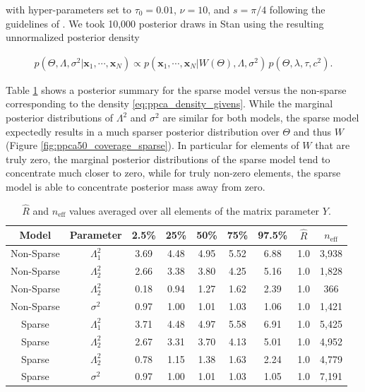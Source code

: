 \documentclass[ba]{imsart}
\newcommand{\mb}[1]{\mathbf{#1}}
\numberwithin{equation}{section}
\theoremstyle{plain}
\begin{document}
\noindent with hyper-parameters set to $\tau_0 = 0.01$, $\nu = 10$, and $s = \pi/4$ following the guidelines of \cite{piironen2017sparsity}. We took 10,000 posterior draws in Stan using the resulting unnormalized posterior density

\begin{eqnarray}
\label{eq:ppca_sparse_density_givens}
p(\Theta, \Lambda, \sigma^2 | \mb{x}_1, \cdots, \mb{x}_N) \propto p(\mb{x}_1, \cdots, \mb{x}_N | W(\Theta), \Lambda, \sigma^2)\, p(\Theta, \lambda, \tau, c^2).
\end{eqnarray}

\noindent Table \ref{tab:ppca50_sparse} shows a posterior summary for the sparse model versus the non-sparse corresponding to the density \ref{eq:ppca_density_givens}. While the marginal posterior distributions of $\Lambda^2$ and $\sigma^2$ are similar for both models, the sparse model expectedly results in a much sparser posterior distribution over $\Theta$ and thus $W$ (Figure \ref{fig:ppca50_coverage_sparse}). In particular for elements of $W$ that are truly zero, the marginal posterior distributions of the sparse model tend to concentrate much closer to zero, while for truly non-zero elements, the sparse model is able to concentrate posterior mass away from zero.

\begin{table}
\begin{tabular}{|cc||ccccccc|}
\hline
Model & Parameter & 2.5\% & 25\% & 50\% & 75\% & 97.5\% &  $\hat{R}$ & $n_{\mathrm{eff}}$\\
\hline
\hline
Non-Sparse & $\Lambda_1^2$  & 3.69 & 4.48 & 4.95 & 5.52 & 6.88 & 1.0 & 3,938\\
Non-Sparse & $\Lambda_2^2$  & 2.66 & 3.38 & 3.80 & 4.25 & 5.16 & 1.0 & 1,828\\
Non-Sparse & $\Lambda_2^2$  & 0.18 & 0.94 & 1.27 & 1.62 & 2.39 & 1.0 & 366 \\
Non-Sparse &  $\sigma^2$ & 0.97 & 1.00 & 1.01 & 1.03 & 1.06 & 1.0 & 1,421\\
\hline
Sparse & $\Lambda_1^2$  & 3.71 & 4.48 & 4.97 & 5.58 & 6.91 & 1.0 & 5,425\\
Sparse & $\Lambda_2^2$  & 2.67 & 3.31 & 3.70 & 4.13 & 5.01 & 1.0 & 4,952\\
Sparse & $\Lambda_2^2$  & 0.78 & 1.15 & 1.38 & 1.63 & 2.24 & 1.0 & 4,779 \\
Sparse &  $\sigma^2$ & 0.97 & 1.00 & 1.01 & 1.03 & 1.05 & 1.0 & 7,191\\
\hline
\end{tabular}
\caption{$\hat{R}$ and $n_{\mathrm{eff}}$ values averaged over all elements of the matrix parameter $Y$. }
\label{tab:ppca50_sparse}
\end{table}
\end{document}
